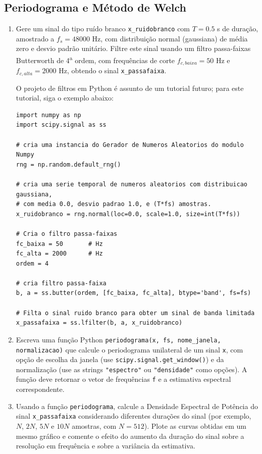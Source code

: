 \documentclass[a4paper,twoside,12pt]{article}
\begin{document}
	\subsection{Periodograma e Método de Welch}
	\begin{enumerate}
		\item Gere um sinal do tipo ruído branco {\tt x\_ruidobranco} com $T = 0.5$ s de duração, amostrado a $f_s = 48000$ Hz, com distribuição normal (gaussiana) de média zero e desvio padrão unitário. Filtre este sinal usando um filtro passa-faixas Butterworth de 4\textsuperscript{a} ordem, com frequências de corte $f_{c,baixa} = 50$ Hz e $f_{c,alta} = 2000$ Hz, obtendo o sinal {\tt x\_passafaixa}.
		
		O projeto de filtros em Python é assunto de um tutorial futuro; para este tutorial, siga o exemplo abaixo:
		
		\begin{lstlisting}[frame=single]
import numpy as np
import scipy.signal as ss

# cria uma instancia do Gerador de Numeros Aleatorios do modulo Numpy
rng = np.random.default_rng()

# cria uma serie temporal de numeros aleatorios com distribuicao gaussiana,
# com media 0.0, desvio padrao 1.0, e (T*fs) amostras.
x_ruidobranco = rng.normal(loc=0.0, scale=1.0, size=int(T*fs))

# Cria o filtro passa-faixas
fc_baixa = 50  		# Hz
fc_alta = 2000  	# Hz
ordem = 4

# cria filtro passa-faixa
b, a = ss.butter(ordem, [fc_baixa, fc_alta], btype='band', fs=fs)

# Filta o sinal ruido branco para obter um sinal de banda limitada
x_passafaixa = ss.lfilter(b, a, x_ruidobranco)
		\end{lstlisting}
		
		\item Escreva uma função Python {\tt periodograma(x, fs, nome\_janela, normalizacao)} que calcule o periodograma unilateral de um sinal {\tt x}, com opção de escolha da janela (use {\tt scipy.signal.get\_window()}) e da normalização (use as strings \texttt{"espectro"} ou \texttt{"densidade"} como opções). A função deve retornar o vetor de frequências {\tt f} e a estimativa espectral correspondente.
		
		\item Usando a função {\tt periodograma}, calcule a Densidade Espectral de Potência do sinal {\tt x\_passafaixa} considerando diferentes durações do sinal (por exemplo, $N$, $2 N$, $5 N$ e $10 N$ amostras, com $N = 512$). Plote as curvas obtidas em um mesmo gráfico e comente o efeito do aumento da duração do sinal sobre a resolução em frequência e sobre a variância da estimativa.
		

\end{enumerate}
\end{document}
